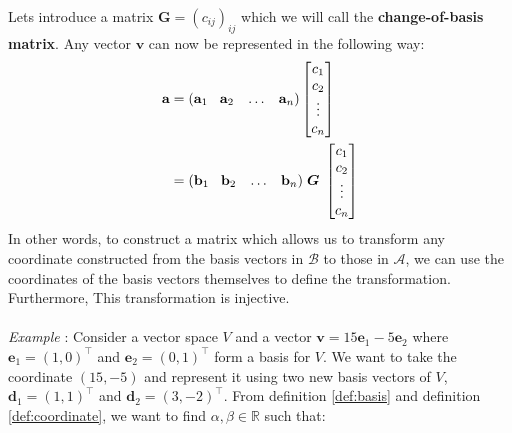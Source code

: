 \documentclass[a4paper,12pt]{article}
\newcommand{\set}[1]{\mathcal{#1}}
\newcommand{\matrx}[1]{\bm{#1}}
\newcommand{\vectr}[1]{\textbf{#1}}
\newcommand{\real}{\mathbb{R}}
\newcommand{\italic}[1]{\textit{#1}}
\begin{document}
	Lets introduce a matrix $ \matrx{G} = (c_{ij})_{ij}$ which we will call the \textbf{change-of-basis matrix}. Any vector $ \vectr{v} $ can now be represented in the following way:
	\begin{align}
		\vectr{a} &= (\vectr{a}_1 \hspace{3mm} \vectr{a}_2 \hspace{3mm} \ldots \hspace{3mm} \vectr{a}_n) \begin{bmatrix}
			c_1 \\ c_2 \\ \vdots \\ c_n
		\end{bmatrix} \\
		&= (\vectr{b}_1 \hspace{3mm} \vectr{b}_2 \hspace{3mm} \ldots \hspace{3mm} \vectr{b}_n) \hspace{1mm} \matrx{G} \hspace{1mm} \begin{bmatrix}
			c_1 \\ c_2 \\ \vdots \\ c_n
		\end{bmatrix}
	\end{align} 
	In other words, to construct a matrix which allows us to transform any coordinate constructed from the basis vectors in $ \set{B} $ to those in $ \set{A} $, we can use the coordinates of the basis vectors themselves to define the transformation. Furthermore, This transformation is injective.
	\\\\
	\italic{Example} \cite{change_basis}: Consider a vector space $ V $ and a vector $ \vectr{v} = 15\vectr{e}_1 - 5\vectr{e}_2 $ where $ \vectr{e}_1 = (1, 0)^{\top} $ and $ \vectr{e}_2 = (0, 1)^{\top} $ form a basis for $ V $. We want to take the coordinate $(15, -5)$ and represent it using two new basis vectors of $ V $, $ \vectr{d}_1 = (1, 1)^{\top} $ and $ \vectr{d}_2 = (3, -2)^{\top} $. From definition \ref{def:basis} and definition \ref{def:coordinate}, we want to find $ \alpha, \beta \in \real $ such that: 
\end{document}
